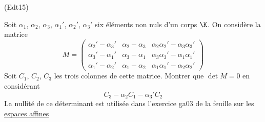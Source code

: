 \begin{tiny}(Edt15)\end{tiny} Soit $\alpha_1$, $\alpha_2$, $\alpha_3$, $\alpha_1'$, $\alpha_2'$, $\alpha_3'$ six éléments non nuls d'un corps $\K$. On considère la matrice
\begin{displaymath}
 M=
\begin{pmatrix}
 \alpha_2'-\alpha_3' & \alpha_2 - \alpha_3 & \alpha_2\alpha_2'-\alpha_3\alpha_3' \\
 \alpha_3'-\alpha_1' & \alpha_3 - \alpha_1 & \alpha_3\alpha_3'-\alpha_1\alpha_1' \\
 \alpha_1'-\alpha_2' & \alpha_1 - \alpha_2 & \alpha_1\alpha_1'-\alpha_2\alpha_2'
\end{pmatrix}
\end{displaymath}
Soit $C_1$, $C_2$, $C_3$ les trois colonnes de cette matrice. Montrer que $\det M = 0$ en considérant
\begin{displaymath}
 C_3-\alpha_2C_1-\alpha_3'C_2
\end{displaymath}
La nullité de ce déterminant est utilisée dans l'exercice ga03 de la feuille sur les \href{\exosurl _fex_ga.pdf}{espaces affines}